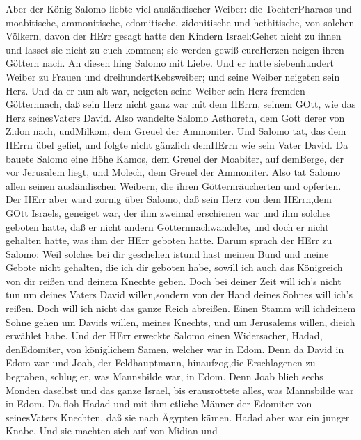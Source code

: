 Aber der König Salomo liebte viel ausländischer Weiber: die
TochterPharaos und moabitische, ammonitische, edomitische, zidonitische
und hethitische,  von solchen Völkern, davon der HErr gesagt
hatte den Kindern Israel:Gehet nicht zu ihnen und lasset sie nicht zu
euch kommen; sie werden gewiß eureHerzen neigen ihren Göttern nach. An
diesen hing Salomo mit Liebe.  Und er hatte siebenhundert
Weiber zu Frauen und dreihundertKebsweiber; und seine Weiber neigeten
sein Herz.  Und da er nun alt war, neigeten seine Weiber
sein Herz fremden Götternnach, daß sein Herz nicht ganz war mit dem
HErrn, seinem GOtt, wie das Herz seinesVaters David.  Also
wandelte Salomo Asthoreth, dem Gott derer von Zidon nach, undMilkom, dem
Greuel der Ammoniter.  Und Salomo tat, das dem HErrn übel
gefiel, und folgte nicht gänzlich demHErrn wie sein Vater David.
 Da bauete Salomo eine Höhe Kamos, dem Greuel der Moabiter,
auf demBerge, der vor Jerusalem liegt, und Molech, dem Greuel der
Ammoniter.  Also tat Salomo allen seinen ausländischen
Weibern, die ihren Götternräucherten und opferten.  Der HErr
aber ward zornig über Salomo, daß sein Herz von dem HErrn,dem GOtt
Israels, geneiget war, der ihm zweimal erschienen war  und
ihm solches geboten hatte, daß er nicht andern Götternnachwandelte, und
doch er nicht gehalten hatte, was ihm der HErr geboten hatte.
 Darum sprach der HErr zu Salomo: Weil solches bei dir
geschehen istund hast meinen Bund und meine Gebote nicht gehalten, die
ich dir geboten habe, sowill ich auch das Königreich von dir reißen und
deinem Knechte geben.  Doch bei deiner Zeit will ich's
nicht tun um deines Vaters David willen,sondern von der Hand deines
Sohnes will ich's reißen.  Doch will ich nicht das ganze
Reich abreißen. Einen Stamm will ichdeinem Sohne gehen um Davids willen,
meines Knechts, und um Jerusalems willen, dieich erwählet habe.
 Und der HErr erweckte Salomo einen Widersacher, Hadad,
denEdomiter, von königlichem Samen, welcher war in Edom. 
Denn da David in Edom war und Joab, der Feldhauptmann, hinaufzog,die
Erschlagenen zu begraben, schlug er, was Mannsbilde war, in Edom.
 Denn Joab blieb sechs Monden daselbst und das ganze
Israel, bis erausrottete alles, was Mannsbilde war in Edom.
 Da floh Hadad und mit ihm etliche Männer der Edomiter von
seinesVaters Knechten, daß sie nach Ägypten kämen. Hadad aber war ein
junger Knabe.  Und sie machten sich auf von Midian und
